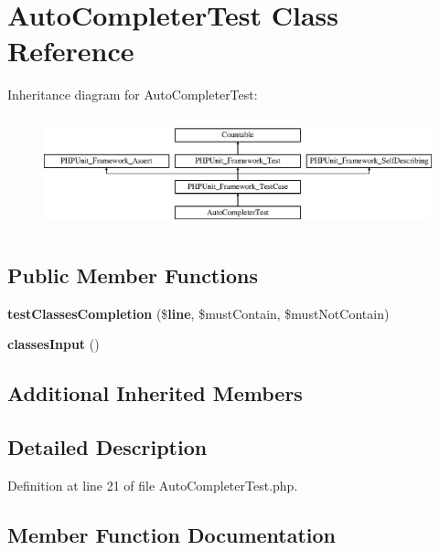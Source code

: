\section{Auto\+Completer\+Test Class Reference}
\label{class_psy_1_1_test_1_1_tab_completion_1_1_auto_completer_test}
Inheritance diagram for Auto\+Completer\+Test\+:\begin{figure}[H]
\begin{center}
\leavevmode
\includegraphics[height=3.303835cm]{class_psy_1_1_test_1_1_tab_completion_1_1_auto_completer_test}
\end{center}
\end{figure}
\subsection*{Public Member Functions}
\begin{DoxyCompactItemize}
\item 
{\bf test\+Classes\+Completion} (\${\bf line}, \$must\+Contain, \$must\+Not\+Contain)
\item 
{\bf classes\+Input} ()
\end{DoxyCompactItemize}
\subsection*{Additional Inherited Members}


\subsection{Detailed Description}


Definition at line 21 of file Auto\+Completer\+Test.\+php.



\subsection{Member Function Documentation}
